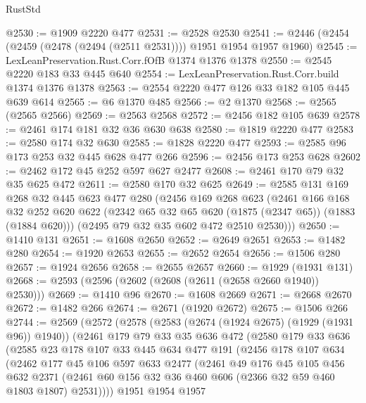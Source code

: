 \begin{lexlean}{RustStd}
\begin{coremodule}
{\begin{coremodule}
{{{{{{{{{{{@2530 := @1909 @2220 @477
@2531 := @2528 @2530
@2541 := @2446 (@2454 (@2459 (@2478 (@2494 (@2511 @2531)))) @1951 @1954 @1957 @1960)
@2545 := LexLeanPreservation.Rust.Corr.fOfB @1374 @1376 @1378
@2550 := @2545 @2220 @183 @33 @445 @640
@2554 := LexLeanPreservation.Rust.Corr.build @1374 @1376 @1378
@2563 := @2554 @2220 @477 @126 @33 @182 @105 @445 @639 @614
@2565 := @6 @1370 @485
@2566 := @2 @1370
@2568 := @2565 (@2565 @2566)
@2569 := @2563 @2568
@2572 := @2456 @182 @105 @639
@2578 := @2461 @174 @181 @32 @36 @630 @638
@2580 := @1819 @2220 @477
@2583 := @2580 @174 @32 @630
@2585 := @1828 @2220 @477
@2593 := @2585 @96 @173 @253 @32 @445 @628 @477 @266
@2596 := @2456 @173 @253 @628
@2602 := @2462 @172 @45 @252 @597 @627 @2477
@2608 := @2461 @170 @79 @32 @35 @625 @472
@2611 := @2580 @170 @32 @625
@2649 := @2585
    @131
    @169
    @268
    @32
    @445
    @623
    @477
    @280
    (@2456
      @169
      @268
      @623
      (@2461
        @166
        @168
        @32
        @252
        @620
        @622
        (@2342 @65 @32 @65 @620 (@1875 (@2347 @65)) (@1883 (@1884 @620)))
        (@2495 @79 @32 @35 @602 @472 @2510 @2530)))
@2650 := @1410 @131
@2651 := @1608 @2650
@2652 := @2649 @2651
@2653 := @1482 @280
@2654 := @1920 @2653
@2655 := @2652 @2654
@2656 := @1506 @280
@2657 := @1924 @2656
@2658 := @2655 @2657
@2660 := @1929 (@1931 @131)
@2668 := @2593 (@2596 (@2602 (@2608 (@2611 (@2658 @2660 @1940)) @2530)))
@2669 := @1410 @96
@2670 := @1608 @2669
@2671 := @2668 @2670
@2672 := @1482 @266
@2674 := @2671 (@1920 @2672)
@2675 := @1506 @266
@2744 := @2569
    (@2572
      (@2578
        (@2583 (@2674 (@1924 @2675) (@1929 (@1931 @96)) @1940))
        (@2461
          @179
          @79
          @33
          @35
          @636
          @472
          (@2580
            @179
            @33
            @636
            (@2585
              @23
              @178
              @107
              @33
              @445
              @634
              @477
              @191
              (@2456
                @178
                @107
                @634
                (@2462
                  @177
                  @45
                  @106
                  @597
                  @633
                  @2477
                  (@2461
                    @49
                    @176
                    @45
                    @105
                    @456
                    @632
                    @2371
                    (@2461 @60 @156 @32 @36 @460 @606 (@2366 @32 @59 @460 @1803 @1807) @2531))))
              @1951
              @1954
              @1957
}}}}}}}}}}}
\end{coremodule}}
\end{coremodule}
\end{lexlean}
